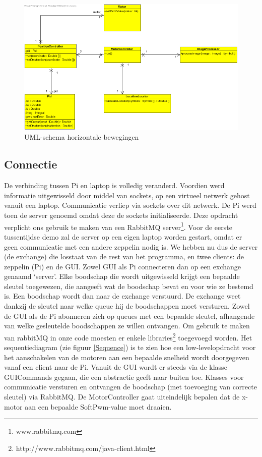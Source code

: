 \documentclass[tt]{penoverslag}
\begin{document}
\begin{figure}[H]
\begin{center}
\includegraphics[width=\textwidth]{XYNavigation.png}
\end{center}
\caption{UML-schema horizontale bewegingen}
\label{navigation}
\end{figure}

\subsection{Connectie}
De verbinding tussen Pi en laptop is volledig veranderd. Voordien werd informatie uitgewisseld door middel van sockets, op een virtueel netwerk gehost vanuit een laptop. Communicatie verliep via sockets over dit netwerk. De Pi werd toen de server genoemd omdat deze de sockets initialiseerde. Deze opdracht verplicht ons gebruik te maken van een RabbitMQ server\footnote{www.rabbitmq.com}. Voor de eerste tussentijdse demo zal de server op een eigen laptop worden gestart, omdat er geen communicatie met een andere zeppelin nodig is. We hebben nu dus de server (de exchange) die losstaat van de rest van het programma, en twee clients: de zeppelin (Pi) en de GUI. Zowel GUI als Pi connecteren dan op een exchange genaamd ‘server’. Elke boodschap die wordt uitgewisseld krijgt een bepaalde sleutel toegewezen, die aangeeft wat de boodschap bevat en voor wie ze bestemd is. Een boodschap wordt dan naar de exchange verstuurd. De exchange weet dankzij de sleutel naar welke queue hij de boodschappen moet versturen. Zowel de GUI als de Pi abonneren zich op queues met een bepaalde sleutel, afhangende van welke gesleutelde boodschappen ze willen ontvangen. Om gebruik te maken van rabbitMQ in onze code moesten er enkele libraries\footnote{http://www.rabbitmq.com/java-client.html} toegevoegd worden. Het sequentiediagram (zie figuur \ref{Sequence}) is te zien hoe een low-levelopdracht voor het aanschakelen van de motoren aan een bepaalde snelheid wordt doorgegeven vanaf een client naar de Pi. Vanuit de GUI wordt er steeds via de klasse GUICommands gegaan, die een abstractie geeft naar buiten toe. Klasses voor communicatie versturen en ontvangen de boodschap (met toevoeging van correcte sleutel) via RabbitMQ. De MotorController gaat uiteindelijk bepalen dat de x-motor aan een bepaalde SoftPwm-value moet draaien.
\\
\end{document}
